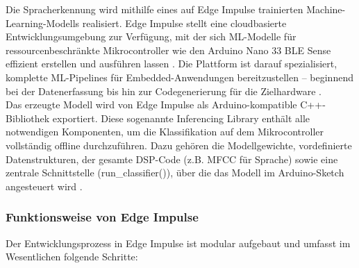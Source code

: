 Die Spracherkennung wird mithilfe eines auf Edge Impulse trainierten Machine-Learning-Modells realisiert. Edge Impulse stellt eine cloudbasierte Entwicklungsumgebung zur Verfügung, mit der sich ML-Modelle für ressourcenbeschränkte Mikrocontroller wie den Arduino Nano 33 BLE Sense effizient erstellen und ausführen lassen \cite{EdgeImpulseDocs:2025}. Die Plattform ist darauf spezialisiert, komplette ML-Pipelines für Embedded-Anwendungen bereitzustellen – beginnend bei der Datenerfassung bis hin zur Codegenerierung für die Zielhardware \cite{EdgeImpulseDocs:2025}\cite{EdgeImpulseLearningBlocksAudio:2025} \cite{EdgeImpulseAudioMFCC:2025}.\\
Das erzeugte Modell wird von Edge Impulse als Arduino-kompatible C++-Bibliothek exportiert. Diese sogenannte Inferencing Library enthält alle notwendigen Komponenten, um die Klassifikation auf dem Mikrocontroller vollständig offline durchzuführen. Dazu gehören die Modellgewichte, vordefinierte Datenstrukturen, der gesamte DSP-Code (z.B. MFCC für Sprache) sowie eine zentrale Schnittstelle (run\_classifier()), über die das Modell im Arduino-Sketch angesteuert wird \cite{EdgeImpulseLearningBlocksAudio:2025} \cite{EdgeImpulseAudioMFCC:2025}\cite{EdgeImpulse:2025Deployment}.\\

\subsubsection{Funktionsweise von Edge Impulse}

Der Entwicklungsprozess in Edge Impulse ist modular aufgebaut und umfasst im Wesentlichen folgende Schritte:

